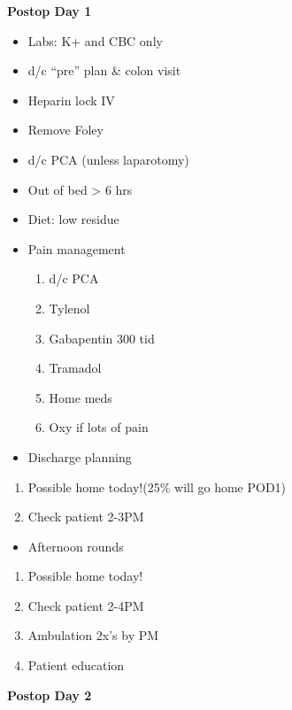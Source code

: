 \documentclass[
  letterpaper,
]{scrbook}
\providecommand{\tightlist}{%
  \setlength{\itemsep}{0pt}\setlength{\parskip}{0pt}}
\begin{document}
\textbf{Postop Day 1}

\begin{itemize}
\tightlist
\item
  Labs: K+ and CBC only
\item
  d/c ``pre'' plan \& colon visit
\item
  Heparin lock IV
\item
  Remove Foley
\item
  d/c PCA (unless laparotomy)
\item
  Out of bed \textgreater{} 6 hrs
\item
  Diet: low residue
\item
  Pain management

  \begin{enumerate}
  \def\labelenumi{\arabic{enumi})}
  \tightlist
  \item
    d/c PCA
  \item
    Tylenol
  \item
    Gabapentin 300 tid
  \item
    Tramadol
  \item
    Home meds
  \item
    Oxy if lots of pain
  \end{enumerate}
\item
  Discharge planning
\end{itemize}

\begin{enumerate}
\def\labelenumi{\arabic{enumi})}
\tightlist
\item
  Possible home today!(25\% will go home POD1)
\item
  Check patient 2-3PM
\end{enumerate}

\begin{itemize}
\tightlist
\item
  Afternoon rounds
\end{itemize}

\begin{enumerate}
\def\labelenumi{\arabic{enumi})}
\tightlist
\item
  Possible home today!
\item
  Check patient 2-4PM
\item
  Ambulation 2x's by PM
\item
  Patient education
\end{enumerate}

\textbf{Postop Day 2}
\end{document}
